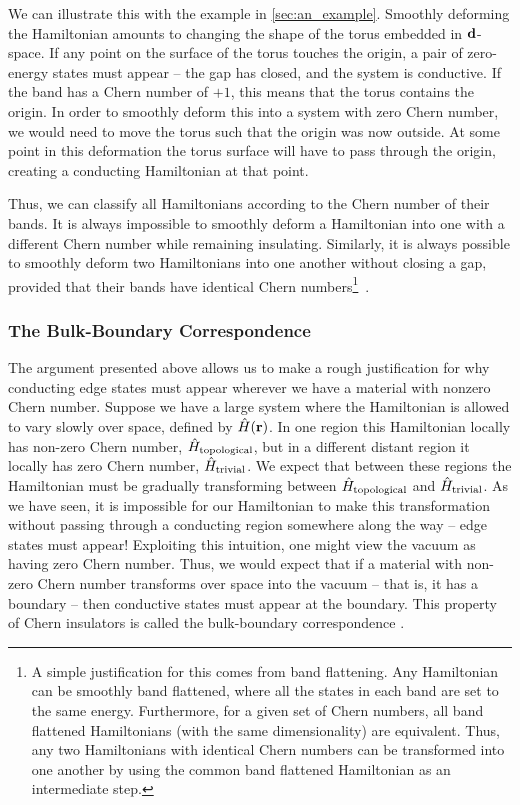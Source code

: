 We can illustrate this with the example in \textsection\ref{sec:an_example}. Smoothly deforming the Hamiltonian amounts to changing the shape of the torus embedded in $\textbf d$-space. If any point on the surface of the torus touches the origin, a pair of zero-energy states must appear -- the gap has closed, and the system is conductive. If the band has a Chern number of $+1$, this means that the torus contains the origin. In order to smoothly deform this into a system with zero Chern number, we would need to move the torus such that the origin was now outside. At some point in this deformation the torus surface will have to pass through the origin, creating a conducting Hamiltonian at that point.

Thus, we can classify all Hamiltonians according to the Chern number of their bands. It is always impossible to smoothly deform a Hamiltonian into one with a different Chern number while remaining insulating. Similarly, it is always possible to smoothly deform two Hamiltonians into one another without closing a gap, provided that their bands have identical Chern numbers\footnote{A simple justification for this comes from band flattening. Any Hamiltonian can be smoothly band flattened, where all the states in each band are set to the same energy. Furthermore, for a given set of Chern numbers, all band flattened Hamiltonians (with the same dimensionality) are equivalent. Thus, any two Hamiltonians with identical Chern numbers can be transformed into one another by using the common band flattened Hamiltonian as an intermediate step.}~\cite{avron_homotopy_1983}.

\subsubsection{The Bulk-Boundary Correspondence}

The argument presented above allows us to make a rough justification for why conducting edge states must appear wherever we have a material with nonzero Chern number. Suppose we have a large system where the Hamiltonian is allowed to vary slowly over space, defined by $\hat H (\textbf r)$. In one region this Hamiltonian locally has non-zero Chern number, $\hat H _{\textup{topological}}$, but in a different distant region it locally has zero Chern number, $\hat H _{\textup{trivial}}$. We expect that between these regions the Hamiltonian must be gradually transforming between $\hat H _{\textup{topological}}$ and $\hat H _{\textup{trivial}}$. As we have seen, it is impossible for our Hamiltonian to make this transformation without passing through a conducting region somewhere along the way -- edge states must appear! Exploiting this intuition, one might view the vacuum as having zero Chern number. Thus, we would expect that if a material with non-zero Chern number transforms over space into the vacuum -- that is, it has a boundary -- then conductive states must appear at the boundary. This property of Chern insulators is called the bulk-boundary correspondence \cite{qi_general_2006,hasan_colloquium_2010,qi_topological_2011}.


